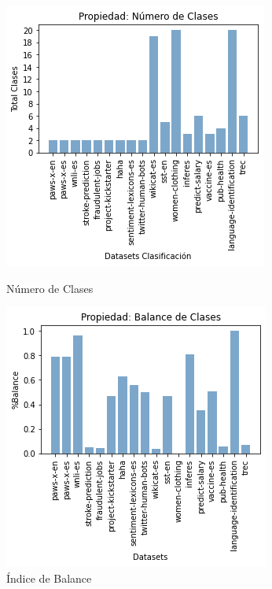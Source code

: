 \begin{figure}
  \centering
    \begin{minipage}[b]{0.31\textwidth}
        \centering
        \includegraphics[width=\textwidth]{Graphics/results/class.png}
          \caption{Número de Clases}
          \label{fig:clases}
    \end{minipage}      
\hspace{0.03cm}
    \begin{minipage}[b]{0.31\textwidth}
        \centering
        \includegraphics[width=\textwidth]{Graphics/results/balance.png}
          \caption{Índice de Balance}
          \label{fig:balance}
        \end{minipage} 
      \end{figure}

